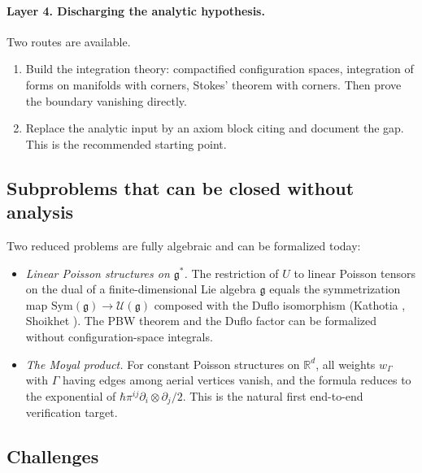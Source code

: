 \documentclass[11pt,a4paper]{article}
\theoremstyle{definition}
\newcommand{\R}{\mathbb{R}}
\newcommand{\defi}[1]{\emph{#1}}
\begin{document}
\paragraph{Layer 4. Discharging the analytic hypothesis.}
Two routes are available.
\begin{enumerate}[label=(\alph*),leftmargin=2em]
  \item Build the integration theory: compactified configuration
        spaces, integration of forms on manifolds with corners,
        Stokes' theorem with corners. Then prove the boundary
        vanishing directly.
  \item Replace the analytic input by an axiom block citing
        \cite[\S6]{Kontsevich2003} and document the gap. This is the
        recommended starting point.
\end{enumerate}

\subsection{Subproblems that can be closed without analysis}
\label{ssec:no-analysis}

Two reduced problems are fully algebraic and can be formalized today:
\begin{itemize}[leftmargin=2em]
  \item \defi{Linear Poisson structures on $\mathfrak{g}^{*}$.} The
        restriction of $U$ to linear Poisson tensors on the dual of a
        finite-dimensional Lie algebra $\mathfrak{g}$ equals the
        symmetrization map $\mathrm{Sym}(\mathfrak{g}) \to
        \mathcal{U}(\mathfrak{g})$ composed with the Duflo isomorphism
        (Kathotia \cite[Thm.~1.1]{Kathotia2000}, Shoikhet
        \cite{Shoikhet2001}). The PBW theorem and the Duflo factor
        can be formalized without configuration-space integrals.
  \item \defi{The Moyal product.} For constant Poisson structures on
        $\R^{d}$, all weights $w_{\Gamma}$ with $\Gamma$ having edges
        among aerial vertices vanish, and the formula reduces to the
        exponential of $\hbar \pi^{ij} \partial_{i} \otimes
        \partial_{j} / 2$. This is the natural first end-to-end
        verification target.
\end{itemize}

\subsection{Challenges}\label{ssec:challenges}
\end{document}
